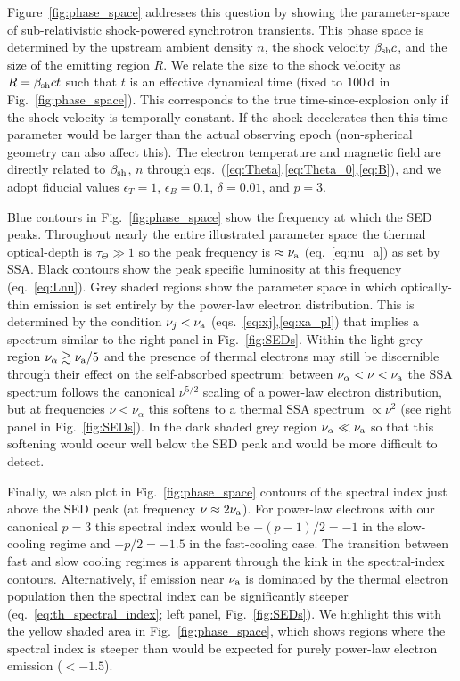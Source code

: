 \documentclass[twocolumn]{aastex63}
\begin{document}
Figure~\ref{fig:phase_space} addresses this question by showing the parameter-space of sub-relativistic shock-powered synchrotron transients.
This phase space is determined by the upstream ambient density $n$, the shock velocity $\beta_{\rm sh}c$, and the size of the emitting region $R$. We relate the size to the shock velocity 
as $R = \beta_{\rm sh} c t$ such that $t$ is an effective dynamical time (fixed to $100\,{\rm d}$ in Fig.~\ref{fig:phase_space}). 
This corresponds to the true time-since-explosion only if the shock velocity is temporally constant. If the shock decelerates then this time parameter would be larger than the actual observing epoch (non-spherical geometry can also affect this).
The electron temperature and magnetic field are directly related to $\beta_{\rm sh}$, $n$ through eqs.~(\ref{eq:Theta},\ref{eq:Theta_0},\ref{eq:B}), and we 
adopt fiducial values $\epsilon_T=1$, $\epsilon_B = 0.1$, $\delta = 0.01$, and $p=3$.

Blue contours in Fig.~\ref{fig:phase_space} show the frequency at which the SED peaks. Throughout nearly the entire illustrated parameter space the thermal optical-depth is $\tau_\Theta \gg 1$ so the peak frequency is $\approx \nu_{\rm a}$ (eq.~\ref{eq:nu_a}) as set by SSA. Black contours show the peak specific luminosity at this frequency (eq.~\ref{eq:Lnu}).
Grey shaded regions show the parameter space in which optically-thin emission is set entirely by the power-law electron distribution. This is determined by the condition $\nu_j < \nu_{\rm a}$ (eqs.~\ref{eq:xj},\ref{eq:xa_pl}) that implies a spectrum similar to the right panel in Fig.~\ref{fig:SEDs}.
Within the light-grey region $\nu_\alpha \gtrsim \nu_{\rm a}/5$ and the presence of thermal electrons may still be discernible through their effect on the self-absorbed spectrum: between $\nu_\alpha < \nu < \nu_{\rm a}$ the SSA spectrum follows the canonical $\nu^{5/2}$ scaling of a power-law electron distribution, but at frequencies $\nu < \nu_\alpha$ this softens to a thermal SSA spectrum $\propto \nu^2$ (see right panel in Fig.~\ref{fig:SEDs}). In the dark shaded grey region $\nu_\alpha \ll \nu_{\rm a}$ so that this softening would occur well below the SED peak and would be more difficult to detect.

Finally, we also plot in Fig.~\ref{fig:phase_space} contours of the spectral index just above the SED peak (at frequency $\nu \approx 2\nu_{\rm a}$). For power-law electrons with our canonical $p=3$ this spectral index would be $-(p-1)/2 = -1$ in the slow-cooling regime and $-p/2 = -1.5$ in the fast-cooling case. 
The transition between fast and slow cooling regimes is apparent through the kink in the spectral-index contours.
Alternatively, if emission near $\nu_{\rm a}$ is dominated by the thermal electron population then the spectral index can be significantly steeper (eq.~\ref{eq:th_spectral_index}; left panel, Fig.~\ref{fig:SEDs}). We highlight this with the yellow shaded area in Fig.~\ref{fig:phase_space}, which shows regions where the spectral index is steeper than would be expected for purely power-law electron emission ($< -1.5$).
\end{document}
